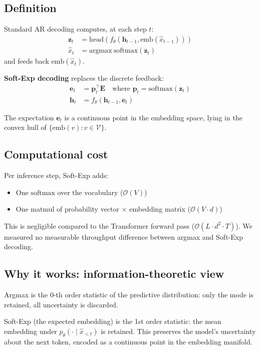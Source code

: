 \documentclass{article}
\begin{document}
\subsection{Definition}

Standard AR decoding computes, at each step $t$:
\begin{align*}
    \mathbf{z}_t &= \mathrm{head}(f_\theta(\mathbf{h}_{t-1}, \mathrm{emb}(\hat{x}_{t-1}))) \\
    \hat{x}_t &= \mathrm{argmax}\ \mathrm{softmax}(\mathbf{z}_t)
\end{align*}
and feeds back $\mathrm{emb}(\hat{x}_t)$.

\textbf{Soft-Exp decoding} replaces the discrete feedback:
\begin{align*}
    \mathbf{e}_t &= \mathbf{p}_t^\top \mathbf{E} \quad \text{where } \mathbf{p}_t = \mathrm{softmax}(\mathbf{z}_t) \\
    \mathbf{h}_t &= f_\theta(\mathbf{h}_{t-1}, \mathbf{e}_t)
\end{align*}

The expectation $\mathbf{e}_t$ is a continuous point in the embedding space, lying in the convex hull of $\{\mathrm{emb}(v) : v \in \mathcal{V}\}$.

\subsection{Computational cost}

Per inference step, Soft-Exp adds:
\begin{itemize}
    \item One $\mathrm{softmax}$ over the vocabulary ($\mathcal{O}(V)$)
    \item One matmul of probability vector $\times$ embedding matrix ($\mathcal{O}(V \cdot d)$)
\end{itemize}
This is negligible compared to the Transformer forward pass ($\mathcal{O}(L \cdot d^2 \cdot T)$). We measured no measurable throughput difference between argmax and Soft-Exp decoding.

\subsection{Why it works: information-theoretic view}

Argmax is the 0-th order statistic of the predictive distribution: only the mode is retained, all uncertainty is discarded.

Soft-Exp (the expected embedding) is the 1st order statistic: the mean embedding under $p_\theta(\cdot \mid \hat{x}_{<t})$ is retained. This preserves the model's uncertainty about the next token, encoded as a continuous point in the embedding manifold.
\end{document}
